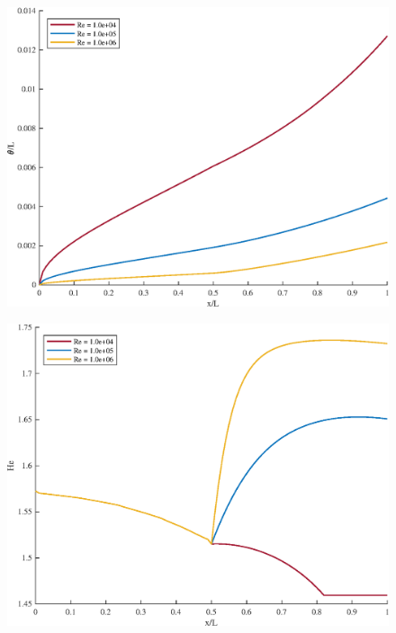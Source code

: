 \begin{figure}[H]
\centering
\includegraphics[scale=0.53]{graphs/e6g3.eps}
\caption{}
\label{e6g3}
\end{figure}

\begin{figure}[H]
\centering
\includegraphics[scale=0.53]{graphs/e6g4.eps}
\caption{}
\label{e6g4}
\end{figure}

